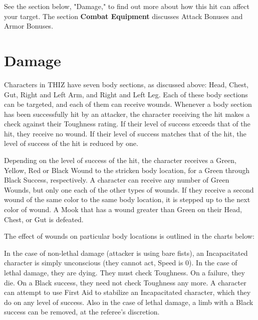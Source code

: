\documentclass[oneside]{book}
\begin{document}
\begin{multicols}{2}
See the section below, "Damage," to find out more about how this hit can affect your target. The section \textbf{Combat Equipment} discusses Attack Bonuses and Armor Bonuses. 

\section{Damage}
Characters in THIZ have seven body sections, as discussed above: Head, Chest, Gut, Right and Left Arm, and Right and Left Leg. Each of these body sections can be targeted, and each of them can receive wounds. Whenever a body section has been successfully hit by an attacker, the character receiving the hit makes a check against their Toughness rating. If their level of success exceeds that of the hit, they receive no wound. If their level of success matches that of the hit, the level of success of the hit is reduced by one. 

Depending on the level of success of the hit, the character receives a Green, Yellow, Red or Black Wound to the stricken body location, for a Green through Black Success, respectively. A character can receive any number of Green Wounds, but only one each of the other types of wounds. If they receive a second wound of the same color to the same body location, it is stepped up to the next color of wound. A Mook that has a wound greater than Green on their Head, Chest, or Gut is defeated.

The effect of wounds on particular body locations is outlined in the charts below:

\begin{center}
\end{center}

In the case of non-lethal damage (attacker is using bare fists), an Incapacitated character is simply unconscious (they cannot act, Speed is 0). In the case of lethal damage, they are dying. They must check Toughness. On a failure, they die. On a Black success, they need not check Toughness any more. A character can attempt to use First Aid to stabilize an Incapacitated character, which they do on any level of success. Also in the case of lethal damage, a limb with a Black success can be removed, at the referee's discretion. 


\end{multicols}
\end{document}
